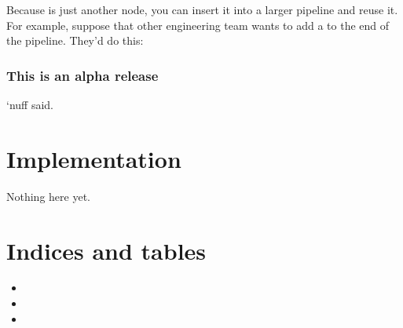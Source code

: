 \documentclass[letterpaper,10pt,english]{sphinxmanual}
\begin{document}
Because  is just another node, you can insert it into a
larger pipeline and reuse it. For example, suppose that other
engineering team wants to add a  to the end of the
pipeline. They’d do this:

%
\begin{sphinxVerbatim}[commandchars=\\\{\}]
  
  
\end{sphinxVerbatim}


\subsection{This is an alpha release}
\label{\detokenize{overview:this-is-an-alpha-release}}
‘nuff said.



\chapter{Implementation}
\label{\detokenize{implementation:implementation}}\label{\detokenize{implementation::doc}}
Nothing here yet.


\chapter{Indices and tables}
\label{\detokenize{index:indices-and-tables}}\begin{itemize}
\item {} 

\item {} 

\item {} 

\end{itemize}



\renewcommand{\indexname}{Index}
\printindex
\end{document}
